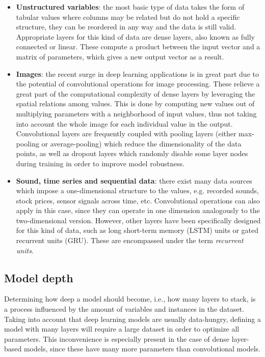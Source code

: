 \begin{itemize}
    \item \textbf{Unstructured variables}: the most basic type of data takes the form of tabular values where columns may be related but do not hold a specific structure, they can be reordered in any way and the data is still valid. Appropriate layers for this kind of data are dense layers, also known as fully connected or linear. These compute a product between the input vector and a matrix of parameters, which gives a new output vector as a result.
    \item \textbf{Images}: the recent surge in deep learning applications is in great part due to the potential of convolutional operations for image processing. These relieve a great part of the computational complexity of dense layers by leveraging the spatial relations among values. This is done by computing new values out of multiplying parameters with a neighborhood of input values, thus not taking into account the whole image for each individual value in the output. Convolutional layers are frequently coupled with pooling layers (either max-pooling or average-pooling) which reduce the dimensionality of the data points, as well as dropout layers which randomly disable some layer nodes during training in order to improve model robustness.
    \item \textbf{Sound, time series and sequential data}: there exist many data sources which impose a one-dimensional structure to the values, e.g. recorded sounds, stock prices, sensor signals across time, etc. Convolutional operations can also apply in this case, since they can operate in one dimension analogously to the two-dimensional version. However, other layers have been specifically designed for this kind of data, such as long short-term memory (LSTM) units or gated recurrent units (GRU). These are encompassed under the term \textit{recurrent units}.
\end{itemize}

\subsection{Model depth}

Determining how deep a model should become, i.e., how many layers to stack, is a process influenced by the amount of variables and instances in the dataset. Taking into account that deep learning models are usually data-hungry, defining a model with many layers will require a large dataset in order to optimize all parameters. This inconvenience is especially present in the case of dense layer-based models, since these have many more parameters than convolutional models.

